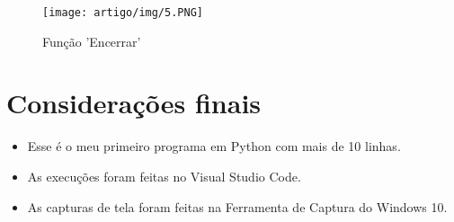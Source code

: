 \begin{figure}[!h]
    \centering
    \texttt{[image: artigo/img/5.PNG]}
    \caption{Função 'Encerrar'}
    \label{fig:my_label}
\end{figure}

\section*{Considerações finais}
\begin{itemize}
    \item Esse é o meu primeiro programa em Python com mais de 10 linhas.
    \item As execuções foram feitas no Visual Studio Code.
    \item As capturas de tela foram feitas na Ferramenta de Captura do Windows 10.
\end{itemize}